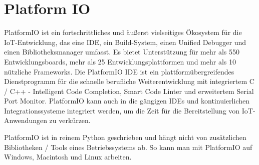


\section{Platform IO}\label{sec:platformio}

PlatformIO ist ein fortschrittliches und äußerst vielseitiges Ökosystem für die IoT-Entwicklung, das eine IDE, ein Build-System, einen Unified Debugger und einen Bibliotheksmanager umfasst. Es bietet Unterstützung für mehr als 550 Entwicklungsboards, mehr als 25 Entwicklungsplattformen und mehr als 10 nützliche Frameworks. Die PlatformIO IDE ist ein plattformübergreifendes Dienstprogramm für die schnelle berufliche Weiterentwicklung mit integriertem C / C++ - Intelligent Code Completion, Smart Code Linter und erweitertem Serial Port Monitor. PlatformIO kann auch in die gängigen IDEs und kontinuierlichen Integrationssysteme integriert werden, um die Zeit für die Bereitstellung von IoT-Anwendungen zu verkürzen.\cite{platformio_about_us}

PlatformIO ist in reinem Python geschrieben und hängt nicht von zusätzlichen Bibliotheken / Tools eines Betriebssystems ab. So kann man mit PlatformIO auf Windows, Macintosh und Linux arbeiten.


